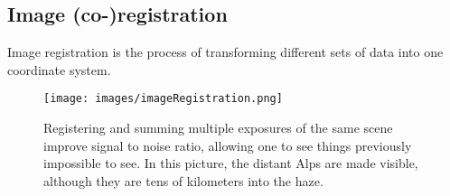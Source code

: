 \subsection{Image (co-)registration}
Image registration is the process of transforming different sets of data into one coordinate system.

\begin{figure}[H]
\centering
\texttt{[image: images/imageRegistration.png]}
\caption{Registering and summing multiple exposures of the same scene improve signal to noise ratio, allowing one to see things previously impossible to see. In this picture, the distant Alps are made visible, although they are tens of kilometers into the haze.}
\end{figure}